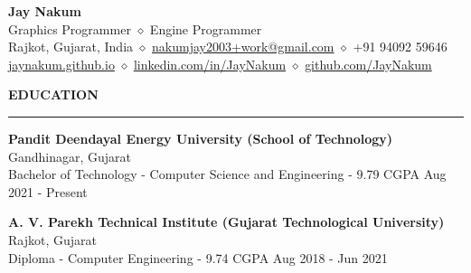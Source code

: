 \documentclass[a4paper, 11pt]{article}
\newenvironment{resumeSection}[1]
{
    \MakeUppercase{\Large\textbf{#1}}
    \medskip
    \hrule
    \begin{list}{}
    {
        \setlength\itemsep{-0.3em}
        \setlength\leftmargin{0em}
    }
    \vspace{-1em}
    \item[]
}
{   \end{list}  }
\begin{document}
\begin{center}
    {\huge \textbf{Jay Nakum} }
    \\
    \smallskip 
    {\large Graphics Programmer $\diamond$ Engine Programmer}
    \\
    Rajkot, Gujarat, India
    $\diamond$
    \href{mailto:nakumjay2003+work@gmail.com}{nakumjay2003+work@gmail.com}
    $\diamond$
    +91 94092 59646
    \\
    \href{https://jaynakum.github.io}{jaynakum.github.io}
    $\diamond$
    \href{https://linkedin.com/in/JayNakum}{linkedin.com/in/JayNakum}
    $\diamond$
    \href{https://github.com/JayNakum}{github.com/JayNakum}
\end{center}  

\medskip
\begin{resumeSection}{Education}
    \item
    \textbf{Pandit Deendayal Energy University (School of Technology)}
    \hfill
    Gandhinagar, Gujarat
    \\
    Bachelor of Technology - Computer Science and Engineering - 9.79 CGPA
    \hfill
    {Aug 2021 - Present}

    \item
    \textbf{A. V. Parekh Technical Institute (Gujarat Technological University)}
    \hfill
    Rajkot, Gujarat
    \\
    Diploma - Computer Engineering - 9.74 CGPA
    \hfill
    {Aug 2018 - Jun 2021}
\end{resumeSection}
\end{document}
